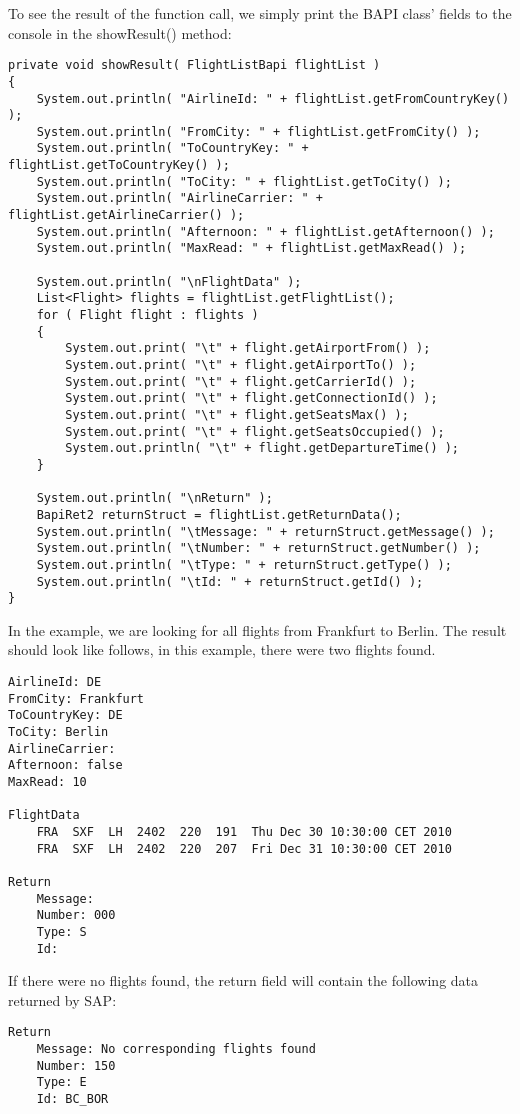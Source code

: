 To see the result of the function call, we simply print the BAPI class' fields to the console in the
showResult() method:

\begin{Verbatim}[frame=single,label=Printing the results]
private void showResult( FlightListBapi flightList )
{
    System.out.println( "AirlineId: " + flightList.getFromCountryKey() );
    System.out.println( "FromCity: " + flightList.getFromCity() );
    System.out.println( "ToCountryKey: " + flightList.getToCountryKey() );
    System.out.println( "ToCity: " + flightList.getToCity() );
    System.out.println( "AirlineCarrier: " + flightList.getAirlineCarrier() );
    System.out.println( "Afternoon: " + flightList.getAfternoon() );
    System.out.println( "MaxRead: " + flightList.getMaxRead() );

    System.out.println( "\nFlightData" );
    List<Flight> flights = flightList.getFlightList();
    for ( Flight flight : flights )
    {
        System.out.print( "\t" + flight.getAirportFrom() );
        System.out.print( "\t" + flight.getAirportTo() );
        System.out.print( "\t" + flight.getCarrierId() );
        System.out.print( "\t" + flight.getConnectionId() );
        System.out.print( "\t" + flight.getSeatsMax() );
        System.out.print( "\t" + flight.getSeatsOccupied() );
        System.out.println( "\t" + flight.getDepartureTime() );
    }

    System.out.println( "\nReturn" );
    BapiRet2 returnStruct = flightList.getReturnData();
    System.out.println( "\tMessage: " + returnStruct.getMessage() );
    System.out.println( "\tNumber: " + returnStruct.getNumber() );
    System.out.println( "\tType: " + returnStruct.getType() );
    System.out.println( "\tId: " + returnStruct.getId() );
}
\end{Verbatim}

In the example, we are looking for all flights from Frankfurt to Berlin.
The result should look like follows, in this example, there were two flights found.

\begin{Verbatim}[frame=single,label=A successful result]
AirlineId: DE
FromCity: Frankfurt
ToCountryKey: DE
ToCity: Berlin
AirlineCarrier:
Afternoon: false
MaxRead: 10

FlightData
	FRA  SXF  LH  2402  220  191  Thu Dec 30 10:30:00 CET 2010
	FRA  SXF  LH  2402  220  207  Fri Dec 31 10:30:00 CET 2010

Return
	Message:
	Number: 000
	Type: S
	Id:
\end{Verbatim}

If there were no flights found, the return field will contain the following data returned by SAP:

\begin{Verbatim}[frame=single,label=The result when no data was found]
Return
	Message: No corresponding flights found
	Number: 150
	Type: E
	Id: BC_BOR
\end{Verbatim}

